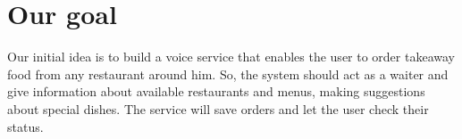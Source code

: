 \section{Our goal}

Our initial idea is to build a voice service that enables the user
to order takeaway food from any restaurant around him.
So, the system should act as a waiter and
give information about available restaurants and menus, making
suggestions about special dishes. The service will save orders
and let the user check their status.